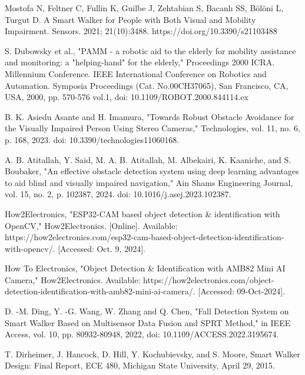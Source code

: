 \begin{thebibliography}{45}
	
	 Mostofa N, Feltner C, Fullin K, Guilbe J, Zehtabian S, Bacanlı SS, Bölöni L, Turgut D. A Smart Walker for People with Both Visual and Mobility Impairment. Sensors. 2021; 21(10):3488. https://doi.org/10.3390/s21103488
	
	 S. Dubowsky et al., "PAMM - a robotic aid to the elderly for mobility assistance and monitoring: a "helping-hand" for the elderly," Proceedings 2000 ICRA. Millennium Conference. IEEE International Conference on Robotics and Automation. Symposia Proceedings (Cat. No.00CH37065), San Francisco, CA, USA, 2000, pp. 570-576 vol.1, doi: 10.1109/ROBOT.2000.844114.ex
	
	 B. K. Asiedu Asante and H. Imamura, "Towards Robust Obstacle Avoidance for the Visually Impaired Person Using Stereo Cameras," Technologies, vol. 11, no. 6, p. 168, 2023. doi: 10.3390/technologies11060168.
	
	 A. B. Atitallah, Y. Said, M. A. B. Atitallah, M. Albekairi, K. Kaaniche, and S. Boubaker, "An effective obstacle detection system using deep learning advantages to aid blind and visually impaired navigation," Ain Shams Engineering Journal, vol. 15, no. 2, p. 102387, 2024. doi: 10.1016/j.asej.2023.102387.
	
	 How2Electronics, "ESP32-CAM based object detection \& identification with OpenCV," How2Electronics. [Online]. Available: https://how2electronics.com/esp32-cam-based-object-detection-identification-with-opencv/. [Accessed: Oct. 9, 2024].
	
	 How To Electronics, "Object Detection \& Identification with AMB82 Mini AI Camera," How2Electronics. Available: https://how2electronics.com/object-detection-identification-with-amb82-mini-ai-camera/. [Accessed: 09-Oct-2024].
	
	 D. -M. Ding, Y. -G. Wang, W. Zhang and Q. Chen, "Fall Detection System on Smart Walker Based on Multisensor Data Fusion and SPRT Method," in IEEE Access, vol. 10, pp. 80932-80948, 2022, doi: 10.1109/ACCESS.2022.3195674.
	
	 T. Dirheimer, J. Hancock, D. Hill, Y. Kochubievsky, and S. Moore, Smart Walker Design: Final Report, ECE 480, Michigan State University, April 29, 2015.
	

\end{thebibliography}
